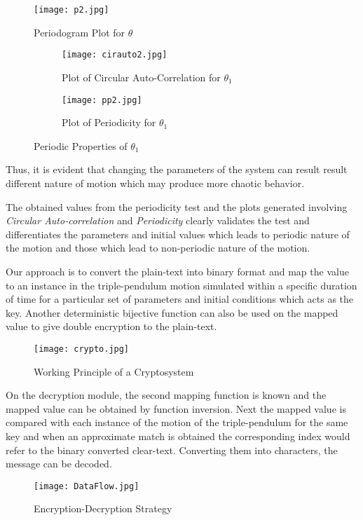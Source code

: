 \begin{figure}[H]
\centering
\texttt{[image: p2.jpg]}
\caption{Periodogram Plot for ${\theta}$ }\label{fig:p2}
\end{figure}

\begin{figure}[H]
\begin{subfigure}{0.5\textwidth}
\texttt{[image: cirauto2.jpg]}
\caption{Plot of Circular Auto-Correlation for ${\theta_{1}}$}\label{fig:cirauto2}
\end{subfigure}
\begin{subfigure}{0.5\textwidth}
\texttt{[image: pp2.jpg]}
\caption{Plot of Periodicity for ${\theta_{1}}$}\label{fig:pp2}
\end{subfigure}
\caption{Periodic Properties of ${\theta_{1}}$}\label{fig:image5}
\end{figure}

Thus, it is evident that changing the parameters of the system can result result different nature of motion which may produce more chaotic behavior.

The obtained values from the periodicity test and the plots generated involving {\em Circular Auto-correlation} and {\em Periodicity} clearly validates the test and differentiates the parameters and initial values which leads to periodic nature of the motion and those which lead to non-periodic nature of the motion.

Our approach is to convert the plain-text into binary format and map the value to an instance in the triple-pendulum motion simulated within a specific duration of time for a particular set of parameters and initial conditions which acts as the key. Another deterministic bijective function can also be used on the mapped value to give double encryption to the plain-text.

\begin{figure}[H]
\centering
\texttt{[image: crypto.jpg]}
\caption{Working Principle of a Cryptosystem}\label{fig:crypto}
\end{figure}

On the decryption module, the second mapping function is known and the mapped value can be obtained by function inversion. Next the mapped value is compared with each instance of the motion of the triple-pendulum for the same key and when an approximate match is obtained the corresponding index would refer to the binary converted clear-text. Converting them into characters, the message can be decoded.\\
\begin{figure}[H]
\centering
\texttt{[image: DataFlow.jpg]}
\caption{Encryption-Decryption Strategy}\label{fig:DataFlow}
\end{figure}

